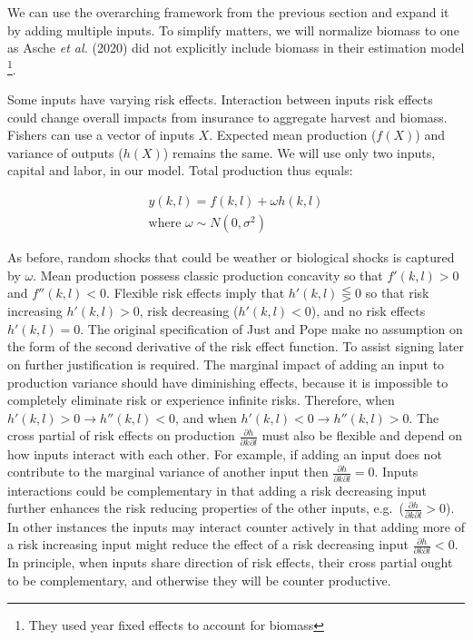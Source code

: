 \documentclass[
  letterpaper,
  DIV=11,
  numbers=noendperiod]{scrartcl}
\theoremstyle{plain}
\theoremstyle{plain}
\theoremstyle{remark}
\begin{document}
We can use the overarching framework from the previous section and
expand it by adding multiple inputs. To simplify matters, we will
normalize biomass to one as Asche \emph{et al.} (2020) did not
explicitly include biomass in their estimation model \footnote{They used
  year fixed effects to account for biomass}.

Some inputs have varying risk effects. Interaction between inputs risk
effects could change overall impacts from insurance to aggregate harvest
and biomass. Fishers can use a vector of inputs \(X\). Expected mean
production (\(f(X)\)) and variance of outputs (\(h(X)\)) remains the
same. We will use only two inputs, capital and labor, in our model.
Total production thus equals:

\[
\begin{aligned}
y(k,l)=f(k,l)+\omega h(k,l)\\
\text{where }\omega \sim N(0,\sigma^2)
\end{aligned}
\]

As before, random shocks that could be weather or biological shocks is
captured by \(\omega\). Mean production possess classic production
concavity so that \(f'(k,l)>0\) and \(f''(k,l)<0\). Flexible risk
effects imply that \(h'(k,l)\lesseqgtr0\) so that risk increasing
\(h'(k,l)>0\), risk decreasing (\(h'(k,l)<0\)), and no risk effects
\(h'(k,l)=0\). The original specification of Just and Pope make no
assumption on the form of the second derivative of the risk effect
function. To assist signing later on further justification is required.
The marginal impact of adding an input to production variance should
have diminishing effects, because it is impossible to completely
eliminate risk or experience infinite risks. Therefore, when
\(h'(k,l)>0 \rightarrow h''(k,l)<0\), and when
\(h'(k,l)<0 \rightarrow h''(k,l)>0\). The cross partial of risk effects
on production \(\frac{\partial h}{\partial k \partial l}\) must also be
flexible and depend on how inputs interact with each other. For example,
if adding an input does not contribute to the marginal variance of
another input then \(\frac{\partial h}{\partial k \partial l}=0\).
Inputs interactions could be complementary in that adding a risk
decreasing input further enhances the risk reducing properties of the
other inputs, e.g.~(\(\frac{\partial h}{\partial k \partial l}>0\)). In
other instances the inputs may interact counter actively in that adding
more of a risk increasing input might reduce the effect of a risk
decreasing input \(\frac{\partial h}{\partial k \partial l}<0\). In
principle, when inputs share direction of risk effects, their cross
partial ought to be complementary, and otherwise they will be counter
productive.
\end{document}

